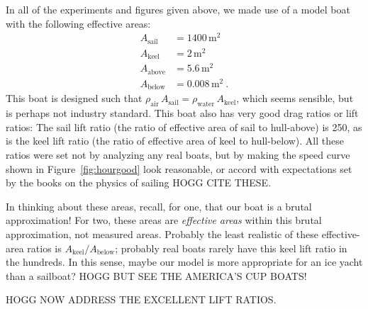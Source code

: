 \documentclass[letterpaper]{article}
\newcommand{\air}{\text{air}}
\newcommand{\water}{\text{water}}
\newcommand{\sail}{\text{sail}}
\newcommand{\keel}{\text{keel}}
\renewcommand{\above}{\text{above}}
\newcommand{\below}{\text{below}}
\newcommand{\mm}{\mathrm{m^2}}
\newcommand{\figref}[1]{Figure~\ref{#1}}
\begin{document}
In all of the experiments and figures given above, we made use of a model boat with the following effective areas:
\begin{align}
  A_\sail &= 1400\,\mm \label{eq:boat1}\\
  A_\keel &= 2\,\mm \\
  A_\above &= 5.6\,\mm \\
  A_\below &= 0.008\,\mm \label{eq:boat4} ~.
\end{align}
This boat is designed such that $\rho_\air\,A_\sail = \rho_\water\,A_\keel$, which seems sensible, but is perhaps not industry standard.
This boat also has very good drag ratios or lift ratios:
The sail lift ratio (the ratio of effective area of sail to hull-above) is 250, as is the keel lift ratio (the ratio of effective area of keel to hull-below).
All these ratios were set not by analyzing any real boats, but by making the speed curve shown in \figref{fig:hourgood} look reasonable, or accord with expectations set by the books on the physics of sailing HOGG CITE THESE.

In thinking about these areas, recall, for one, that our boat is a brutal approximation!
For two, these areas are \emph{effective areas} within this brutal approximation, not measured areas.
Probably the least realistic of these effective-area ratios is $A_\keel/A_\below$; probably real boats rarely have this keel lift ratio in the hundreds.
In this sense, maybe our model is more appropriate for an ice yacht than a sailboat?
HOGG BUT SEE THE AMERICA'S CUP BOATS!

HOGG NOW ADDRESS THE EXCELLENT LIFT RATIOS.
\end{document}
